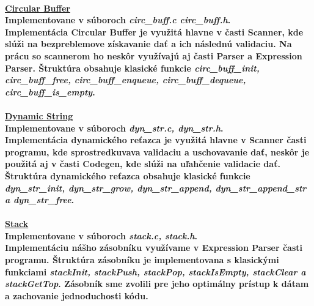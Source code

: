 \documentclass[12pt]{article}
\begin{document}
\paragraph{\large \underline{Circular Buffer}\normalsize \\ Implementovane v súboroch \textit{circ\_buff.c circ\_buff.h}. \\ \newline
Implementácia Circular Buffer je využitá hlavne v časti Scanner, kde slúži na bezpreblemove získavanie dať a ich následnú validaciu. Na prácu so scannerom ho neskôr využívajú aj časti Parser a Expression Parser. Štruktúra obsahuje klasické funkcie \textit{circ\_buff\_init, circ\_buff\_free, circ\_buff\_enqueue, circ\_buff\_dequeue, circ\_buff\_is\_empty}. 
\newline \\}

\paragraph{\large \underline{Dynamic String}\normalsize \\ Implementovane v súboroch \textit{dyn\_str.c, dyn\_str.h}. \\ \newline
Implementácia dynamického reťazca je využitá hlavne v Scanner časti programu, kde sprostredkuvava validaciu a uschovavanie dať, neskôr je použitá aj v časti Codegen, kde slúži na uľahčenie validacie dať. Štruktúra dynamického reťazca obsahuje klasické funkcie \textit{dyn\_str\_init, dyn\_str\_grow, dyn\_str\_append, dyn\_str\_append\_str a dyn\_str\_free}.  
\newline \\}

\paragraph{\large \underline{Stack}\normalsize \\ Implementovane v súboroch \textit{stack.c, stack.h}. \\ \newline
Implementáciu nášho zásobníku využívame v Expression Parser časti programu. Štruktúra zásobníku je implementovana s klasickými funkciami \textit{stackInit, stackPush, stackPop, stackIsEmpty, stackClear a stackGetTop}. Zásobník sme zvolili pre jeho optimálny prístup k dátam a zachovanie jednoduchosti kódu.
\newline \\}
\end{document}
